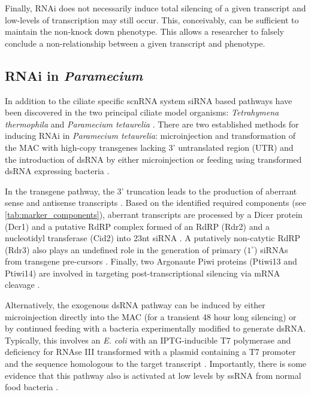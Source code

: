 Finally, RNAi does not necessarily induce total silencing
of a given transcript and low-levels of transcription may still occur.
This, conceivably, can be sufficient to maintain the non-knock down phenotype.
This allows a researcher to falsely conclude a non-relationship between
a given transcript and phenotype.

\subsection{RNAi in \textit{Paramecium}}

In addition to the ciliate specific scnRNA system 
siRNA based pathways have been discovered in the two principal
ciliate model organisms: \textit{Tetrahymena thermophila} \citep{Collins2006,Yao2005}
and \textit{Paramecium tetaurelia} \citep{Galvani2001,Galvani2002}. 
There are two established methods for inducing RNAi in \textit{Paramecium tetaurelia}:
microinjection and transformation of the MAC with high-copy transgenes lacking 3' untranslated
region (UTR) \citep{Galvani2001} and the introduction of dsRNA by either
microinjection or feeding using transformed dsRNA expressing bacteria 
\citep{Galvani2002}.

In the transgene pathway, the 3' truncation leads to the production of aberrant
sense and antisense transcripts \citep{Galvani2001,Marker2010,Beisson2010b}.
Based on the identified required components (see \cref{tab:marker_components}), 
aberrant transcripts
are processed by a Dicer protein (Dcr1) \citep{Lepere2009} and
a putative RdRP complex formed of an RdRP (Rdr2) and a nucleotidyl
transferase (Cid2) \citep{Marker2014} into 23nt siRNA \citep{Lepere2009}. 
A putatively non-catytic 
RdRP (Rdr3) also plays an undefined role in the generation
of primary (\(1^{\circ}\)) siRNAs from transgene pre-cursors \citep{Marker2010,Marker2014}.
Finally, two Argonaute Piwi proteins (Ptiwi13 and Ptiwi14) \citep{Bouhouche2011} 
are involved in targeting post-transcriptional silencing via mRNA
cleavage \citep{Bouhouche2011,Marker2014}.


Alternatively, the exogenous dsRNA pathway can be induced by either microinjection directly
into the MAC (for a transient 48 hour long silencing) or by continued feeding
with a bacteria experimentally modified to generate dsRNA.
Typically, this involves an \textit{E. coli} 
with an IPTG-inducible T7 polymerase and 
deficiency for RNAse III transformed with
a plasmid containing a T7 promoter and the sequence
homologous to the target transcript
\citep{Fire1998,Timmons2001,Galvani2002}.
Importantly, there is some evidence that this pathway also is activated at low
levels by ssRNA from normal food bacteria \citep{Carradec2015}.

